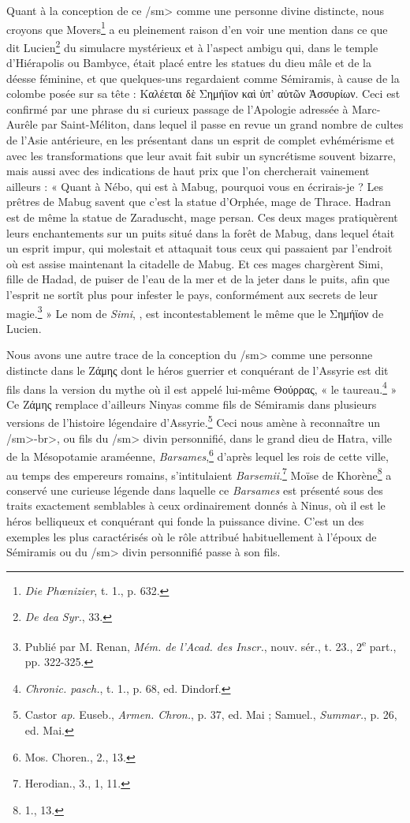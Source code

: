 \documentclass[a4paper, 11pt, oneside, landscape]{article}
\newcommand*\svgAAAG{}
\begin{document}
Quant à la conception de ce \</sm> comme une personne divine distincte, nous croyons que Movers\footnote{\emph{Die Phœnizier}, t. 1., p. 632.} a eu pleinement raison d'en voir une mention dans ce que dit Lucien\footnote{\emph{De dea Syr.}, 33.} du simulacre mystérieux et à l'aspect ambigu qui, dans le temple d'Hiérapolis ou Bambyce, était placé entre les statues du dieu mâle et de la déesse féminine, et que quelques-uns regardaient comme Sémiramis, à cause de la colombe posée sur sa tête : Καλέεται δὲ Σημήϊον καὶ ὑπ' αὐτῶν Ἀσσυρίων. Ceci est confirmé par une phrase du si curieux passage de l'Apologie adressée à Marc-Aurêle par Saint-Méliton, dans lequel il passe en revue un grand nombre de cultes de l'Asie antérieure, en les présentant dans un esprit de complet evhémérisme et avec les transformations que leur avait fait subir un syncrétisme souvent bizarre, mais aussi avec des indications de haut prix que l'on chercherait vainement ailleurs : « Quant à Nébo, qui est à Mabug, pourquoi vous en écrirais-je ? Les prêtres de Mabug savent que c'est la statue d'Orphée, mage de Thrace. Hadran est de même la statue de Zaraduscht, mage persan. Ces deux mages pratiquèrent leurs enchantements sur un puits situé dans la forêt de Mabug, dans lequel était un esprit impur, qui molestait et attaquait tous ceux qui passaient par l'endroit où est assise maintenant la citadelle de Mabug. Et ces mages chargèrent Simi, fille de Hadad, de puiser de l'eau de la mer et de la jeter dans le puits, afin que l'esprit ne sortît plus pour infester le pays, conformément aux secrets de leur magie.\footnote{Publié par M. Renan, \emph{Mém. de l'Acad. des Inscr.}, nouv. sér., t. 23., 2\textsuperscript{e} part., pp. 322-325.} » Le nom de \emph{Simi}, $\svgAAAG$, est incontestablement le même que le Σημήϊον de Lucien.

Nous avons une autre trace de la conception du \</sm> comme une personne distincte dans le Ζάμης dont le héros guerrier et conquérant de l'Assyrie est dit fils dans la version du mythe où il est appelé lui-même Θούρρας, « le taureau.\footnote{\emph{Chronic. pasch.}, t. 1., p. 68, ed. Dindorf.} » Ce Ζάμης remplace d'ailleurs Ninyas comme fils de Sémiramis dans plusieurs versions de l'histoire légendaire d'Assyrie.\footnote{Castor \emph{ap.} Euseb., \emph{Armen. Chron.}, p. 37, ed. Mai ; Samuel., \emph{Summar.}, p. 26, ed. Mai.} Ceci nous amène à reconnaître un \</sm>-\<br>, ou fils du \</sm> divin personnifié, dans le grand dieu de Hatra, ville de la Mésopotamie araméenne, \emph{Barsames},\footnote{Mos. Choren., 2., 13.} d'après lequel les rois de cette ville, au temps des empereurs romains, s'intitulaient \emph{Barsemii}.\footnote{Herodian., 3., 1, 11.} Moïse de Khorène\footnote{1., 13.} a conservé une curieuse légende dans laquelle ce \emph{Barsames} est présenté sous des traits exactement semblables à ceux ordinairement donnés à Ninus, où il est le héros belliqueux et conquérant qui fonde la puissance divine. C'est un des exemples les plus caractérisés où le rôle attribué habituellement à l'époux de Sémiramis ou du \</sm> divin personnifié passe à son fils.
\end{document}
